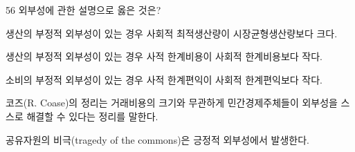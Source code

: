 \begin{question}{56}
외부성에 관한 설명으로 옳은 것은?
\begin{choices}
  \item 생산의 부정적 외부성이 있는 경우 사회적 최적생산량이 시장균형생산량보다 크다.
  \item 생산의 부정적 외부성이 있는 경우 사적 한계비용이 사회적 한계비용보다 작다.
  \item 소비의 부정적 외부성이 있는 경우 사적 한계편익이 사회적 한계편익보다 작다.
  \item 코즈(R. Coase)의 정리는 거래비용의 크기와 무관하게 민간경제주체들이 외부성을 스스로 해결할 수 있다는 정리를 말한다.
  \item 공유자원의 비극(tragedy of the commons)은 긍정적 외부성에서 발생한다.
\end{choices}
\end{question}
